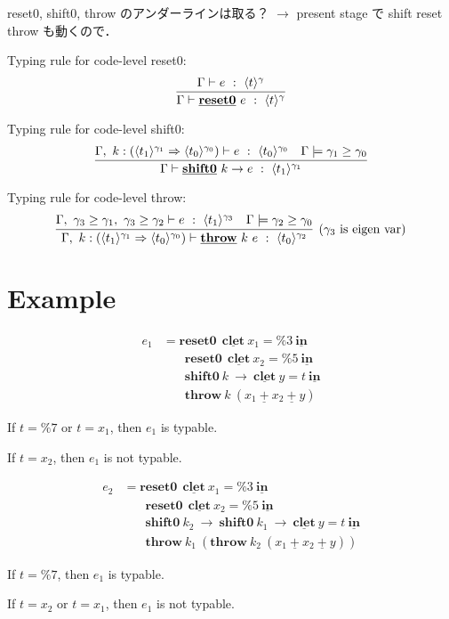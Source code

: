 \documentclass[10pt,a4j]{jarticle}
\newcommand\Resetz{\textbf{reset0}}
\newcommand\Shiftz{\textbf{shift0}}
\newcommand\Throw{\textbf{throw}}
\newcommand\cResetz{\underline{\textbf{reset0}}}
\newcommand\cShiftz{\underline{\textbf{shift0}}}
\newcommand\cThrow{\underline{\textbf{throw}}}
\newcommand\cresetz[1]{\cResetz~{#1}}
\newcommand\cshiftz[2]{\cShiftz~{#1}\to{#2}}
\newcommand\cthrow[2]{\cThrow~{#1}~{#2}}
\newcommand\cPlus{\underline{\textbf{+}}}
\newcommand\cLet{\underline{\textbf{clet}}}
\newcommand\cIn{\underline{\textbf{in}}}
\newcommand\csp[1]{\texttt{\%}{#1}}
\newcommand\codeT[2]{\langle{#1}\rangle^{#2}}
\newcommand\contT[2]{({#1} \Rightarrow {#2})}
\newcommand\ord{\ge}
\begin{document}
reset0, shift0, throw のアンダーラインは取る？
$\rightarrow$ present stage で shift reset throw も動くので．

Typing rule for code-level reset0:
\[
  \infer{\Gamma \vdash \cresetz{e} ~:~ \codeT{t}{\gamma}}
  {\Gamma \vdash e ~:~ \codeT{t}{\gamma}}
\]

Typing rule for code-level shift0:
\[
  \infer{\Gamma \vdash \cshiftz{k}{e} ~:~ \codeT{t_1}{\gamma_1}}
  {\Gamma,~k:\contT{\codeT{t_1}{\gamma_1}}{\codeT{t_0}{\gamma_0}}
    \vdash e ~:~ \codeT{t_0}{\gamma_0}
    & \Gamma \models \gamma_1 \ord \gamma_0
  }
\]

Typing rule for code-level throw:
\[
  \infer[(\gamma_3~\text{is eigen var})]
  {\Gamma,~k:\contT{\codeT{t_1}{\gamma_1}}{\codeT{t_0}{\gamma_0}}
    \vdash \cthrow{k}{e} ~:~ \codeT{t_0}{\gamma_2}}
  {\Gamma,~
    \gamma_3 \ord \gamma_1,~
    \gamma_3 \ord \gamma_2
    \vdash e ~:~ \codeT{t_1}{\gamma_3}
    & \Gamma \models \gamma_2 \ord \gamma_0
  }
\]


\section{Example}

\begin{align*}
  e_1 & = \Resetz ~~\cLet~x_1=\csp{3}~\cIn \\
      & \phantom{=}~~ \Resetz ~~\cLet~x_2=\csp{5}~\cIn \\
      & \phantom{=}~~ \Shiftz~k~\to~\cLet~y=t~\cIn \\
      & \phantom{=}~~ \Throw~k~(x_1~\cPlus~x_2~\cPlus~y)
\end{align*}

If $t=\csp{7}$ or $t=x_1$, then $e_1$ is typable.

If $t=x_2$, then $e_1$ is not typable.

\begin{align*}
  e_2 & = \Resetz ~~\cLet~x_1=\csp{3}~\cIn \\
      & \phantom{=}~~ \Resetz ~~\cLet~x_2=\csp{5}~\cIn \\
      & \phantom{=}~~ \Shiftz~k_2~\to~ \Shiftz~k_1~\to~ \cLet~y=t~\cIn \\
      & \phantom{=}~~ \Throw~k_1~(\Throw~k_2~(x_1~\cPlus~x_2~\cPlus~y))
\end{align*}

If $t=\csp{7}$, then $e_1$ is typable.

If $t=x_2$ or $t=x_1$, then $e_1$ is not typable.
\end{document}
